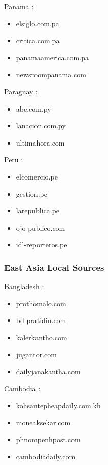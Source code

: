 \documentclass[
  letterpaper,
  DIV=11,
  numbers=noendperiod]{scrartcl}
\providecommand{\tightlist}{%
  \setlength{\itemsep}{0pt}\setlength{\parskip}{0pt}}\usepackage{longtable,booktabs,array}
\begin{document}
Panama :

\begin{itemize}
\tightlist
\item
  elsiglo.com.pa
\item
  critica.com.pa
\item
  panamaamerica.com.pa
\item
  newsroompanama.com
\end{itemize}

Paraguay :

\begin{itemize}
\tightlist
\item
  abc.com.py
\item
  lanacion.com.py
\item
  ultimahora.com
\end{itemize}

Peru :

\begin{itemize}
\tightlist
\item
  elcomercio.pe
\item
  gestion.pe
\item
  larepublica.pe
\item
  ojo-publico.com
\item
  idl-reporteros.pe
\end{itemize}

\subsubsection{East Asia Local Sources}\label{east-asia-local-sources}

Bangladesh :

\begin{itemize}
\tightlist
\item
  prothomalo.com
\item
  bd-pratidin.com
\item
  kalerkantho.com
\item
  jugantor.com
\item
  dailyjanakantha.com
\end{itemize}

Cambodia :

\begin{itemize}
\tightlist
\item
  kohsantepheapdaily.com.kh
\item
  moneaksekar.com
\item
  phnompenhpost.com
\item
  cambodiadaily.com
\end{itemize}
\end{document}
